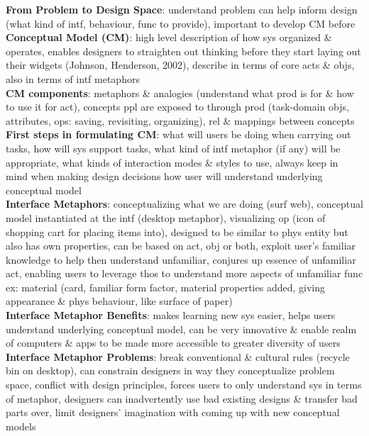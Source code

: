 \documentclass[a4paper]{article}
\begin{document}
\begin{multicols}{3}
        \textbf{From Problem to Design Space}: understand problem can help inform design (what kind of intf, behaviour, func to provide), important to develop CM before\\
        \textbf{Conceptual Model (CM)}: high level description of how sys organized \& operates, enables designers to straighten out thinking before they start laying out their widgets (Johnson, Henderson, 2002), describe in terms of core acts \& objs, also in terms of intf metaphors\\
        \textbf{CM components}: metaphors \& analogies (understand what prod is for \& how to use it for act), concepts ppl are exposed to through prod (task-domain objs, attributes, ops: saving, revisiting, organizing), rel \& mappings between concepts\\
        \textbf{First steps in formulating CM}: what will users be doing when carrying out tasks, how will sys support tasks, what kind of intf metaphor (if any) will be appropriate, what kinds of interaction modes \& styles to use, always keep in mind when making design decisions how user will understand underlying conceptual model\\
        \textbf{Interface Metaphors}: conceptualizing what we are doing (surf web), conceptual model instantiated at the intf (desktop metaphor), visualizing op (icon of shopping cart for placing items into), designed to be similar to phys entity but also has own properties, can be based on act, obj or both, exploit user's familiar knowledge to help then understand unfamiliar, conjures up essence of unfamiliar act, enabling users to leverage thos to understand more aspects of unfamiliar func ex: material (card, familiar form factor, material properties added, giving appearance \& phys behaviour, like surface of paper)\\
        \textbf{Interface Metaphor Benefits}: makes learning new sys easier, helps users understand underlying conceptual model, can be very innovative \& enable realm of computers \& apps to be made more accessible to greater diversity of users\\
        \textbf{Interface Metaphor Problems}: break conventional \& cultural rules (recycle bin on desktop), can constrain designers in way they conceptualize problem space, conflict with design principles, forces users to only understand sys in terms of metaphor, designers can inadvertently use bad existing designs \& transfer bad parts over, limit designers' imagination with coming up with new conceptual models\\

\end{multicols}
\end{document}
